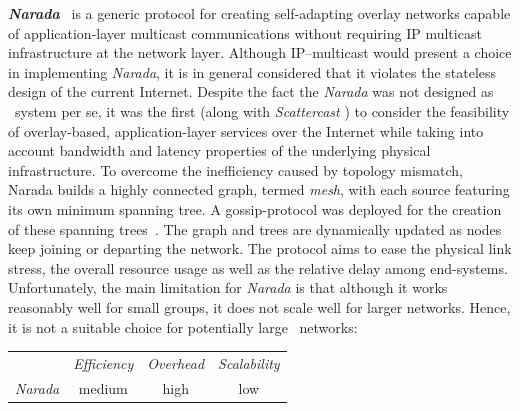 
\textbf{\emph{Narada}}~\cite{CRZ2000,CRSZ2001,CRSZ2002} is a generic
protocol for creating self-adapting overlay networks capable of 
application-layer multicast communications without requiring IP multicast
infrastructure at the network layer.
Although IP--multicast would present a choice in implementing
\emph{Narada}, it is in general considered that it violates the 
stateless design of the current Internet.
Despite the fact the \emph{Narada} was not designed as \p\ system per se,
it was the first (along with \emph{Scattercast} \cite{C2000}) to consider the
feasibility of overlay-based, application-layer services over the Internet while
taking into account bandwidth and latency properties of the underlying physical
infrastructure. To overcome the inefficiency caused by 
topology mismatch, Narada builds a highly connected
graph, termed \emph{mesh},
with each source featuring its own minimum spanning tree. A gossip-protocol was
deployed for the creation of these spanning trees~\cite{LYL2008}.
The graph and trees are dynamically updated as nodes keep joining 
or departing the network. The protocol aims to ease the physical link stress,
the overall resource usage as well as the relative delay among end-systems. 
Unfortunately, the main limitation for \emph{Narada} is that 
although it works reasonably well for small groups, 
it does not scale well for larger networks. 
Hence, it is not a suitable choice for potentially large \p\ networks:
\begin{center}
{\footnotesize
\begin{tabular}{rccc}
\multicolumn{1}{r}{} &
\multicolumn{1}{c}{\emph{Efficiency}} &
\multicolumn{1}{c}{\emph{Overhead}} &
\multicolumn{1}{c}{\emph{Scalability}}
\\
\cline{2-4}
\emph{Narada} &
%
medium &
high &
low
\end{tabular}
}
\end{center}

